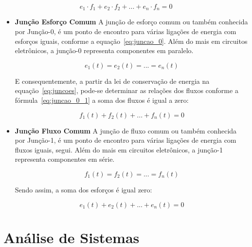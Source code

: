\begin{equation}
    \label{eq:juncoes}
    e_1 \cdot f_1 +  e_2 \cdot f_2 + ... +e_n \cdot f_n = 0
\end{equation}

\begin{itemize}
    \item \textbf{Junção Esforço Comum}
    A junção de esforço comum ou também conhecida por Junção-0, é um ponto de encontro para várias ligações de energia com esforços iguais, conforme a equação~\ref{eq:juncao_0}. Além do mais em circuitos eletrônicos, a junção-0 representa componentes em paralelo.
 
    \begin{equation}\label{eq:juncao_0}
        e_1(t) = e_2 (t) = ... = e_n (t)
    \end{equation}

    E consequentemente, a partir da lei de conservação de energia na equação~\ref{eq:juncoes}, pode-se determinar as relações dos fluxos conforme a fórmula~\ref{eq:juncao_0_1} a soma dos fluxos é igual a zero:

    \begin{equation}\label{eq:juncao_0_1}
        f_1 (t) +  f_2  (t) + ... + f_n (t) = 0
    \end{equation}

\item \textbf{Junção Fluxo Comum }
    A junção de fluxo comum ou também conhecida por Junção-1, é um ponto de encontro para várias ligações de energia com fluxos iguais, segui.  Além do mais em circuitos eletrônicos, a junção-1 representa componentes em série.

    \begin{equation}\label{eq:juncao_1}
        f_1(t) = f_2 (t) = ... = f_n (t)
    \end{equation}

    Sendo assim, a soma dos esforços é igual zero:

    \begin{equation}\label{eq:juncao_1_1}
        e_1 (t) +  e_2  (t) + ... + e_n (t) = 0
    \end{equation}
\end{itemize}


\section{Análise de Sistemas}
